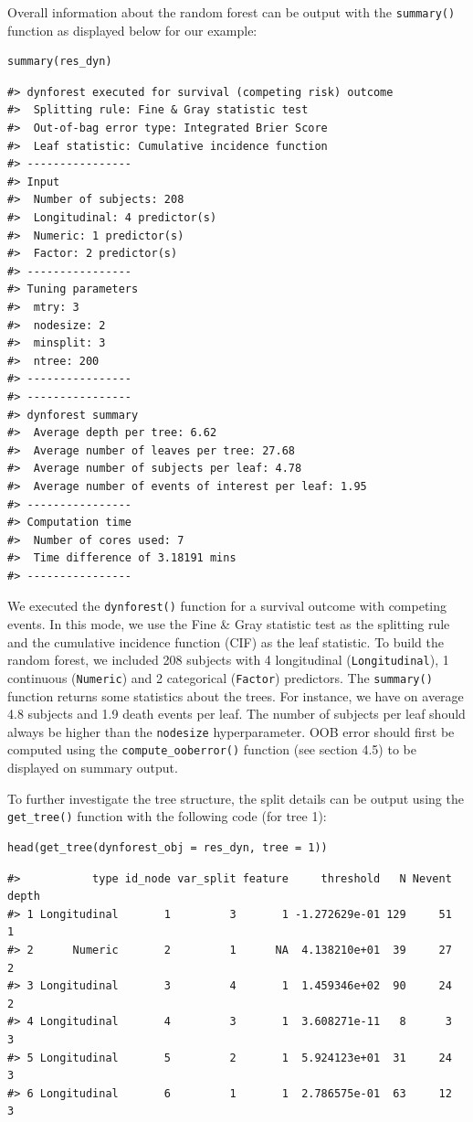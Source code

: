 Overall information about the random forest can be output with the \texttt{summary()} function as displayed below for our example:

\begin{verbatim}
summary(res_dyn)
\end{verbatim}

\begin{verbatim}
#> dynforest executed for survival (competing risk) outcome 
#>  Splitting rule: Fine & Gray statistic test 
#>  Out-of-bag error type: Integrated Brier Score 
#>  Leaf statistic: Cumulative incidence function 
#> ---------------- 
#> Input 
#>  Number of subjects: 208 
#>  Longitudinal: 4 predictor(s) 
#>  Numeric: 1 predictor(s) 
#>  Factor: 2 predictor(s) 
#> ---------------- 
#> Tuning parameters 
#>  mtry: 3 
#>  nodesize: 2 
#>  minsplit: 3 
#>  ntree: 200 
#> ---------------- 
#> ---------------- 
#> dynforest summary 
#>  Average depth per tree: 6.62 
#>  Average number of leaves per tree: 27.68 
#>  Average number of subjects per leaf: 4.78 
#>  Average number of events of interest per leaf: 1.95 
#> ---------------- 
#> Computation time 
#>  Number of cores used: 7 
#>  Time difference of 3.18191 mins
#> ----------------
\end{verbatim}

We executed the \texttt{dynforest()} function for a survival outcome with competing events. In this mode, we use the Fine \& Gray statistic test as the splitting rule and the cumulative incidence function (CIF) as the leaf statistic. To build the random forest, we included 208 subjects with 4 longitudinal (\texttt{Longitudinal}), 1 continuous (\texttt{Numeric}) and 2 categorical (\texttt{Factor}) predictors. The \texttt{summary()} function returns some statistics about the trees. For instance, we have on average 4.8 subjects and 1.9 death events per leaf. The number of subjects per leaf should always be higher than the \texttt{nodesize} hyperparameter. OOB error should first be computed using the \texttt{compute\_ooberror()} function (see section 4.5) to be displayed on summary output.

To further investigate the tree structure, the split details can be output using the \texttt{get\_tree()} function with the following code (for tree 1):

\begin{verbatim}
head(get_tree(dynforest_obj = res_dyn, tree = 1))
\end{verbatim}

\begin{verbatim}
#>           type id_node var_split feature     threshold   N Nevent depth
#> 1 Longitudinal       1         3       1 -1.272629e-01 129     51     1
#> 2      Numeric       2         1      NA  4.138210e+01  39     27     2
#> 3 Longitudinal       3         4       1  1.459346e+02  90     24     2
#> 4 Longitudinal       4         3       1  3.608271e-11   8      3     3
#> 5 Longitudinal       5         2       1  5.924123e+01  31     24     3
#> 6 Longitudinal       6         1       1  2.786575e-01  63     12     3
\end{verbatim}

